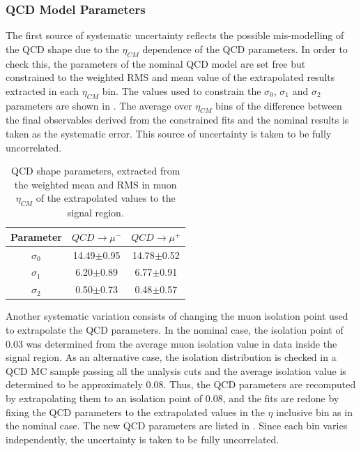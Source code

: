 \subsubsection{QCD Model Parameters}

The first source of systematic uncertainty reflects the possible mis-modelling of the QCD shape due to the $\eta_{CM}$ dependence of the QCD parameters. In order to check this, the parameters of the nominal QCD model are set free but constrained to the weighted RMS and mean value of the extrapolated results extracted in each $\eta_{CM}$ bin. The values used to constrain the $\sigma_{0}$,  $\sigma_{1}$ and  $\sigma_{2}$ parameters are shown in . The average over $\eta_{CM}$ bins of the difference between the final observables derived from the constrained fits and the nominal results is taken as the systematic error. This source of uncertainty is taken to be fully uncorrelated.

\begin{table}[!htbp]
  \begin{center}
  \begin{tabular}{|c|c|c|}\hline
  Parameter & $QCD \to \mu^{-}$ & $QCD \to \mu^{+}$ \\\hline
  $\sigma_{0}$ & 14.49$\pm$0.95 & 14.78$\pm$0.52 \\\hline
  $\sigma_{1}$ & 6.20$\pm$0.89 & 6.77$\pm$0.91\\\hline
  $\sigma_{2}$ & 0.50$\pm$0.73 & 0.48$\pm$0.57\\\hline
  \end{tabular}
  \end{center}
  \caption{QCD shape parameters, extracted from the weighted mean and RMS in muon $\eta_{CM}$ of the extrapolated values to the signal region.}
  \label{tab:QCDContrainPar}
\end{table}

Another systematic variation consists of changing the muon isolation point used to extrapolate the QCD parameters. In the nominal case, the isolation point of 0.03 was determined from the average muon isolation value in data inside the signal region. As an alternative case, the isolation distribution is checked in a QCD MC sample passing all the analysis cuts and the average isolation value is  determined to be approximately 0.08. Thus, the QCD parameters are recomputed by extrapolating them to an isolation point of 0.08, and the fits are redone by fixing the QCD parameters to the extrapolated values in the $\eta$ inclusive bin as in the nominal case. The new QCD parameters are listed in . Since each bin varies independently, the uncertainty is taken to be fully uncorrelated.

